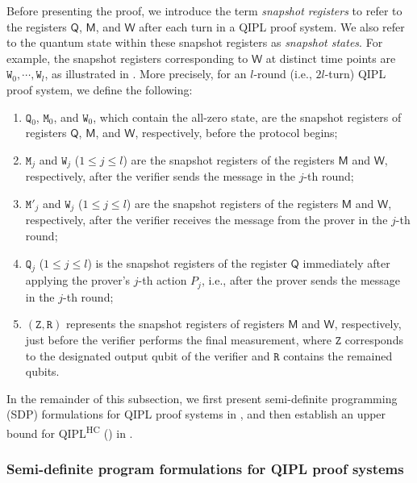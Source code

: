 \documentclass[11pt, a4paper]{article}
\numberwithin{equation}{section}
\numberwithin{figure}{section}
\newcommand{\QIPL}{\textnormal{\textsf{QIPL}}\xspace}
\newcommand{\QIPLHC}{\texorpdfstring{\textnormal{\textsf{QIPL}\textsuperscript{\textnormal{HC}}}}\xspace}
\newcommand{\sfM}{\mathsf{M}}
\newcommand{\sfQ}{\mathsf{Q}}
\newcommand{\sfW}{\mathsf{W}}
\newcommand{\ttM}{\mathtt{M}}
\newcommand{\ttQ}{\mathtt{Q}}
\newcommand{\ttR}{\mathtt{R}}
\newcommand{\ttW}{\mathtt{W}}
\newcommand{\ttZ}{\mathtt{Z}}
\begin{document}
\vspace{1em}
Before presenting the proof, we introduce the term \textit{snapshot registers} to refer to the registers $\sfQ$, $\sfM$, and $\sfW$ after each turn in a \QIPL{} proof system. We also refer to the quantum state within these snapshot registers as \textit{snapshot states}. For example, the snapshot registers corresponding to $\sfW$ at distinct time points are $\ttW_0,\cdots,\ttW_l$, as illustrated in . 
More precisely, for an $l$-round (i.e., $2l$-turn) \QIPL{} proof system, we define the following: 
\begin{enumerate}[label={\upshape(\arabic*)}, topsep=0.33em, itemsep=0.33em, parsep=0.33em]
    \item $\ttQ_0$, $\ttM_0$, and $\ttW_0$, which contain the all-zero state, are the snapshot registers of registers $\sfQ$, $\sfM$, and $\sfW$, respectively, before the protocol begins;
    \item $\ttM_j$ and $\ttW_j$ ($1 \leq j \leq l$) are the snapshot registers of the registers $\sfM$ and $\sfW$, respectively, after the verifier sends the message in the $j$-th round;
    \item $\ttM'_j$ and $\ttW_j$ ($1 \leq j \leq l$) are the snapshot registers of the registers $\sfM$ and $\sfW$, respectively, after the verifier receives the message from the prover in the $j$-th round; 
    \item $\ttQ_j$ ($1 \leq j \leq l$) is the snapshot registers of the register $\sfQ$ immediately after applying the prover's $j$-th action $P_j$, i.e., after the prover sends the message in the $j$-th round; 
    \item $(\ttZ,\ttR)$ represents the snapshot registers of registers $\sfM$ and $\sfW$, respectively, just before the verifier performs the final measurement, where $\ttZ$ corresponds to the designated output qubit of the verifier and $\ttR$ contains the remained qubits. 
\end{enumerate}

In the remainder of this subsection, we first present semi-definite programming (SDP) formulations for \QIPL{} proof systems in , and then establish an upper bound for \QIPLHC{} () in . 

\subsubsection{Semi-definite program formulations for \QIPL{} proof systems}
\label{subsubsec:SDP-formulation}
\end{document}
